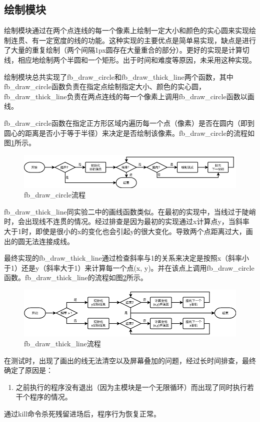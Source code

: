 \documentclass{report}
\begin{document}
\subsection{绘制模块}
\par 绘制模块通过在两个点连线的每一个像素上绘制一定大小和颜色的实心圆来实现绘制连贯、有一定宽度的线的功能。这种实现的主要优点是简单易实现，缺点是进行了大量的重复绘制（两个间隔1px圆存在大量重合的部分）。更好的实现是计算切线，相应地绘制两个半圆和一个矩形。出于时间和难度等原因，未采用这种实现。
\par 绘制模块总共实现了fb\_draw\_circle和fb\_draw\_thick\_line两个函数，其中fb\_draw\_circle函数负责在指定点绘制指定大小、颜色的实心圆，fb\_draw\_thick\_line负责在两点连线的每一个像素上调用fb\_draw\_circle函数以画线。
\par fb\_draw\_circle函数在指定正方形区域内遍历每一个点（像素）是否在圆内（即到圆心的距离是否小于等于半径）来决定是否绘制该像素。fb\_draw\_circle的流程如图\ref{fig:drawcirc}所示。
\begin{figure}[htpb]
    \centering
    \includegraphics[width=0.8\linewidth]{drawcirc.png}
    \caption{fb\_draw\_circle流程}
    \label{fig:drawcirc}
\end{figure}
\par fb\_draw\_thick\_line同实验二中的画线函数类似。在最初的实现中，当线过于陡峭时，会出现线不连贯的情况。经过排查是因为最初的实现通过x计算点y，当斜率大于1时，即使是很小的x的变化也会引起y的很大变化。导致两个点距离过大，画出的圆无法连接成线。
\par 最终实现的fb\_draw\_thick\_line通过检查斜率与1的关系来决定是按照x（斜率小于1）还是y（斜率大于1）来计算每一个点(x, y)。并在该点上调用fb\_draw\_circle函数。fb\_draw\_thick\_line的流程如图\ref{fig:thickline}所示。
\begin{figure}[htpb]
    \centering
    \includegraphics[width=0.8\linewidth]{thickline.png}
    \caption{fb\_draw\_thick\_line流程}
    \label{fig:thickline}
\end{figure}
\par 在测试时，出现了画出的线无法清空以及屏幕叠加的问题，经过长时间排查，最终确定了原因是：
\begin{enumerate}
    \item 之前执行的程序没有退出（因为主模块是一个无限循环）而出现了同时执行若干个程序的情况。
\end{enumerate}
\par 通过kill命令杀死残留进场后，程序行为恢复正常。
\end{document}
